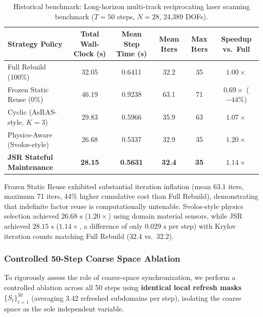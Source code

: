 \documentclass[preprint,12pt,3p]{elsarticle}
\begin{document}
\begin{table}[htbp]
\centering
\small
\caption{Historical benchmark: Long-horizon multi-track reciprocating laser scanning benchmark ($T=50$ steps, $N=28$, 24,389 DOFs).}
\label{tab:long_horizon}
\begin{tabular}{lccccc}
\toprule
\textbf{Strategy Policy} & \textbf{Total Wall-Clock (s)} & \textbf{Mean Step Time (s)} & \textbf{Mean Iters} & \textbf{Max Iters} & \textbf{Speedup vs.\ Full} \\
\midrule
Full Rebuild (100\%) & 32.05 & 0.6411 & 32.2 & 35 & $1.00\times$ \\
Frozen Static Reuse (0\%) & 46.19 & 0.9238 & 63.1 & 71 & $0.69\times$ ($-44\%$) \\
Cyclic (AsRAS-style, $K=3$) & 29.83 & 0.5966 & 35.9 & 63 & $1.07\times$ \\
Physics-Aware (Svolos-style) & 26.68 & 0.5337 & 32.9 & 35 & $1.20\times$ \\
\textbf{JSR Stateful Maintenance} & \textbf{28.15} & \textbf{0.5631} & \textbf{32.4} & \textbf{35} & $\mathbf{1.14\times}$ \\
\bottomrule
\end{tabular}
\end{table}

Frozen Static Reuse exhibited substantial iteration inflation (mean 63.1 iters, maximum 71 iters, 44\% higher cumulative cost than Full Rebuild), demonstrating that indefinite factor reuse is computationally untenable. Svolos-style physics selection achieved $26.68\text{ s}$ ($1.20\times$) using domain material sensors, while JSR achieved $28.15\text{ s}$ ($1.14\times$, a difference of only $0.029\text{ s}$ per step) with Krylov iteration counts matching Full Rebuild ($32.4$ vs.\ $32.2$).

\subsubsection{Controlled 50-Step Coarse Space Ablation}
To rigorously assess the role of coarse-space synchronization, we perform a controlled ablation across all 50 steps using \textbf{identical local refresh masks} $\{S_t\}_{t=1}^{50}$ (averaging 3.42 refreshed subdomains per step), isolating the coarse space as the sole independent variable.
\end{document}
